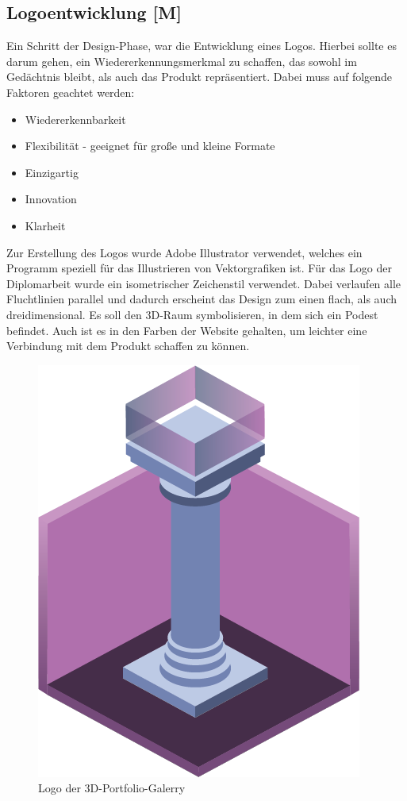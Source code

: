 \subsection{Logoentwicklung [M]}
Ein Schritt der Design-Phase, war die Entwicklung eines Logos. Hierbei sollte es darum gehen, ein Wiedererkennungsmerkmal zu schaffen, das sowohl im Gedächtnis bleibt, als auch das Produkt repräsentiert. Dabei muss auf folgende Faktoren geachtet werden:

\begin{itemize}
    \item Wiedererkennbarkeit
    \item Flexibilität - geeignet für große und kleine Formate
    \item Einzigartig
    \item Innovation
    \item Klarheit
\end{itemize}
\cite{LogoKriterien}

Zur Erstellung des Logos wurde Adobe Illustrator verwendet, welches ein Programm speziell für das Illustrieren von Vektorgrafiken ist. Für das Logo der Diplomarbeit wurde ein isometrischer Zeichenstil verwendet. Dabei verlaufen alle Fluchtlinien parallel und dadurch erscheint das Design zum einen flach, als auch dreidimensional. Es soll den 3D-Raum symbolisieren, in dem sich ein Podest befindet. Auch ist es in den Farben der Website gehalten, um leichter eine Verbindung mit dem Produkt schaffen zu können.
\cite{IsometricStyle}
\cite{Logo}

\begin{figure} [h]
    \centering
    \includegraphics[scale=0.3]{pics/3d-logo.png}
    \caption{Logo der 3D-Portfolio-Galerry}
\end{figure}

